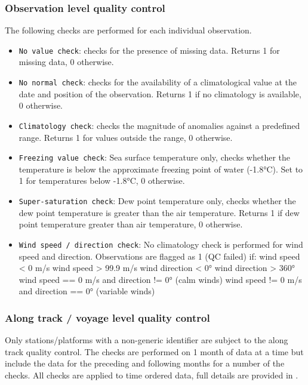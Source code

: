 {\subsubsection{Observation level quality control} \label{obs-qc}

The following checks are performed for each individual observation.

\begin{itemize}[resume]
\item \texttt{No value check}: checks for the presence of missing data. Returns 1 for missing data, 0 otherwise.
\item \texttt{No normal check}: checks for the availability of a climatological value at the date and position of the observation. Returns 1 if no climatology is available, 0 otherwise.
\item \texttt{Climatology check}: checks the magnitude of anomalies against a predefined range. Returns 1 for values outside the range, 0 otherwise.
\item \texttt{Freezing value check}: Sea surface temperature only, checks whether the temperature is below the approximate freezing point of water (-1.8°C). Set to 1 for temperatures below -1.8°C, 0 otherwise. 
\item \texttt{Super-saturation check}: Dew point temperature only, checks whether the dew point temperature is greater than the air temperature. Returns 1 if dew point temperature greater than air temperature, 0 otherwise.
\item \texttt{Wind speed / direction check}: No climatology check is performed for wind speed and direction. Observations are flagged as 1 (QC failed) if:
\subitem wind speed < 0 m/s
\subitem wind speed > 99.9 m/s 
\subitem wind direction < 0°
\subitem wind direction > 360°
\subitem wind speed == 0 m/s and direction != 0° (calm winds)
\subitem wind speed != 0 m/s and direction == 0° (variable winds)


\end{itemize}

\FloatBarrier
\subsubsection{Along track / voyage level quality control} \label{track-qc}
Only stations/platforms with a non-generic identifier are subject to the along track quality control. The checks are performed on 1 month of data at a time but include the data for the preceding and following months for a number of the checks. All checks are applied to time ordered data, full details are provided in \cite{Kennedy2019}.

}
